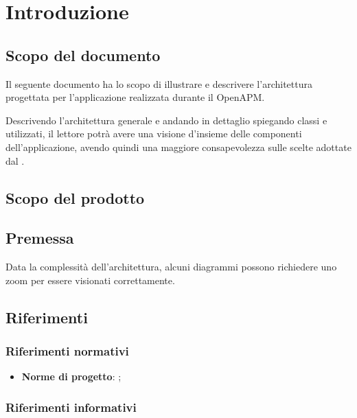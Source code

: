 \section{Introduzione} \label{intro}

    \subsection{Scopo del documento}

        Il seguente documento ha lo scopo di illustrare e descrivere l'architettura progettata per l'applicazione
        realizzata durante il  OpenAPM.

        Descrivendo l'architettura generale e andando in dettaglio spiegando classi e  utilizzati, il lettore potrà avere una visione d'insieme delle componenti dell'applicazione, avendo
        quindi una maggiore consapevolezza sulle scelte adottate dal .

    \subsection{Scopo del prodotto}

        \ScopoProdotto{}

    \subsection{Premessa}

        Data la complessità dell'architettura, alcuni diagrammi possono richiedere uno zoom per essere visionati correttamente.

    \subsection{Riferimenti}

        \subsubsection{Riferimenti normativi}

            \begin{itemize}
    	        \item
    	            \textbf{Norme di progetto}: \vNormeDiProgetto{};
    	    \end{itemize}

        \subsubsection{Riferimenti informativi}

